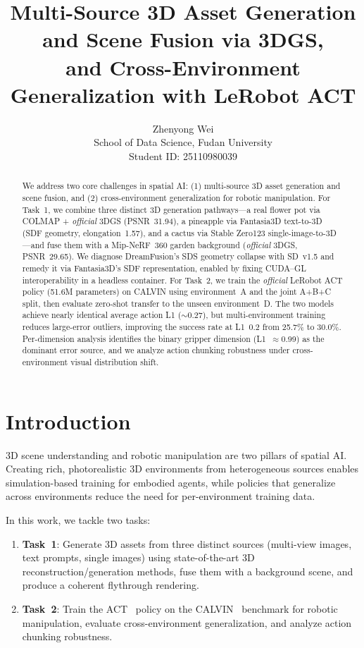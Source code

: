 \documentclass[10pt,twocolumn,letterpaper]{article}
\title{Multi-Source 3D Asset Generation and Scene Fusion via 3DGS,\\and Cross-Environment Generalization with LeRobot ACT}
\author{
  Zhenyong Wei \\
  School of Data Science, Fudan University \\
  Student ID: 25110980039
}
\date{}
\begin{document}
\maketitle

\begin{abstract}
We address two core challenges in spatial AI: (1) multi-source 3D asset generation and scene fusion, and (2) cross-environment generalization for robotic manipulation. For Task~1, we combine three distinct 3D generation pathways---a real flower pot via COLMAP + \emph{official} 3DGS (PSNR~31.94), a pineapple via Fantasia3D text-to-3D (SDF geometry, elongation~1.57), and a cactus via Stable Zero123 single-image-to-3D---and fuse them with a Mip-NeRF~360 garden background (\emph{official} 3DGS, PSNR~29.65). We diagnose DreamFusion's SDS geometry collapse with SD~v1.5 and remedy it via Fantasia3D's SDF representation, enabled by fixing CUDA--GL interoperability in a headless container. For Task~2, we train the \emph{official} LeRobot ACT policy (51.6M parameters) on CALVIN using environment~A and the joint A+B+C split, then evaluate zero-shot transfer to the unseen environment~D. The two models achieve nearly identical average action L1 ($\sim$0.27), but multi-environment training reduces large-error outliers, improving the success rate at L1~0.2 from 25.7\% to 30.0\%. Per-dimension analysis identifies the binary gripper dimension (L1~$\approx$0.99) as the dominant error source, and we analyze action chunking robustness under cross-environment visual distribution shift.
\end{abstract}

\section{Introduction}

3D scene understanding and robotic manipulation are two pillars of spatial AI. Creating rich, photorealistic 3D environments from heterogeneous sources enables simulation-based training for embodied agents, while policies that generalize across environments reduce the need for per-environment training data.

In this work, we tackle two tasks:
\begin{enumerate}
\item \textbf{Task~1}: Generate 3D assets from three distinct sources (multi-view images, text prompts, single images) using state-of-the-art 3D reconstruction/generation methods, fuse them with a background scene, and produce a coherent flythrough rendering.
\item \textbf{Task~2}: Train the ACT~\cite{zhao2023act} policy on the CALVIN~\cite{mees2022calvin} benchmark for robotic manipulation, evaluate cross-environment generalization, and analyze action chunking robustness.
\end{enumerate}
\end{document}
